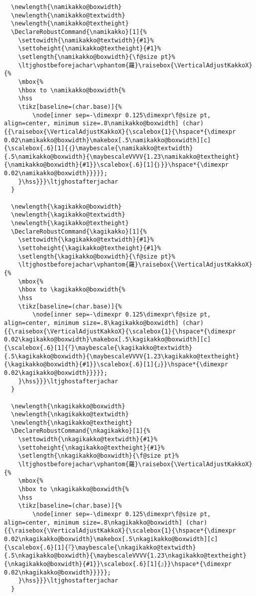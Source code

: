 \documentclass[luatex,fontsize=10pt,paper=b5,twoside]{jlreq}%
\begin{document}
\begin{lstlisting}
  \newlength{\namikakko@boxwidth}
  \newlength{\namikakko@textwidth}
  \newlength{\namikakko@textheight}
  \DeclareRobustCommand{\namikakko}[1]{%
    \settowidth{\namikakko@textwidth}{#1}%
    \settoheight{\namikakko@textheight}{#1}%
    \setlength{\namikakko@boxwidth}{\f@size pt}%
    \ltjghostbeforejachar\vphantom{羅}\raisebox{\VerticalAdjustKakkoX}{%
    \mbox{%
    \hbox to \namikakko@boxwidth{%
    \hss
    \tikz[baseline=(char.base)]{%
        \node[inner sep=-\dimexpr 0.125\dimexpr\f@size pt, align=center, minimum size=.8\namikakko@boxwidth] (char) {{\raisebox{\VerticalAdjustKakkoX}{\scalebox{1}{\hspace*{\dimexpr 0.02\namikakko@boxwidth}\makebox[.5\namikakko@boxwidth][c]{\scalebox{.6}[1]{｛}\maybescale{\namikakko@textwidth}{.5\namikakko@boxwidth}{\maybescaleVVVV{1.23\namikakko@textheight}{\namikakko@boxwidth}{#1}}\scalebox{.6}[1]{｝}}\hspace*{\dimexpr 0.02\namikakko@boxwidth}}}}};
    }\hss}}}\ltjghostafterjachar
  }

  \newlength{\kagikakko@boxwidth}
  \newlength{\kagikakko@textwidth}
  \newlength{\kagikakko@textheight}
  \DeclareRobustCommand{\kagikakko}[1]{%
    \settowidth{\kagikakko@textwidth}{#1}%
    \settoheight{\kagikakko@textheight}{#1}%
    \setlength{\kagikakko@boxwidth}{\f@size pt}%
    \ltjghostbeforejachar\vphantom{羅}\raisebox{\VerticalAdjustKakkoX}{%
    \mbox{%
    \hbox to \kagikakko@boxwidth{%
    \hss
    \tikz[baseline=(char.base)]{%
        \node[inner sep=-\dimexpr 0.125\dimexpr\f@size pt, align=center, minimum size=.8\kagikakko@boxwidth] (char) {{\raisebox{\VerticalAdjustKakkoX}{\scalebox{1}{\hspace*{\dimexpr 0.02\kagikakko@boxwidth}\makebox[.5\kagikakko@boxwidth][c]{\scalebox{.6}[1]{「}\maybescale{\kagikakko@textwidth}{.5\kagikakko@boxwidth}{\maybescaleVVVV{1.23\kagikakko@textheight}{\kagikakko@boxwidth}{#1}}\scalebox{.6}[1]{」}}\hspace*{\dimexpr 0.02\kagikakko@boxwidth}}}}};
    }\hss}}}\ltjghostafterjachar
  }

  \newlength{\nkagikakko@boxwidth}
  \newlength{\nkagikakko@textwidth}
  \newlength{\nkagikakko@textheight}
  \DeclareRobustCommand{\nkagikakko}[1]{%
    \settowidth{\nkagikakko@textwidth}{#1}%
    \settoheight{\nkagikakko@textheight}{#1}%
    \setlength{\nkagikakko@boxwidth}{\f@size pt}%
    \ltjghostbeforejachar\vphantom{羅}\raisebox{\VerticalAdjustKakkoX}{%
    \mbox{%
    \hbox to \nkagikakko@boxwidth{%
    \hss
    \tikz[baseline=(char.base)]{%
        \node[inner sep=-\dimexpr 0.125\dimexpr\f@size pt, align=center, minimum size=.8\nkagikakko@boxwidth] (char) {{\raisebox{\VerticalAdjustKakkoX}{\scalebox{1}{\hspace*{\dimexpr 0.02\nkagikakko@boxwidth}\makebox[.5\nkagikakko@boxwidth][c]{\scalebox{.6}[1]{『}\maybescale{\nkagikakko@textwidth}{.5\nkagikakko@boxwidth}{\maybescaleVVVV{1.23\nkagikakko@textheight}{\nkagikakko@boxwidth}{#1}}\scalebox{.6}[1]{』}}\hspace*{\dimexpr 0.02\nkagikakko@boxwidth}}}}};
    }\hss}}}\ltjghostafterjachar
  }


\end{lstlisting}
\end{document}
